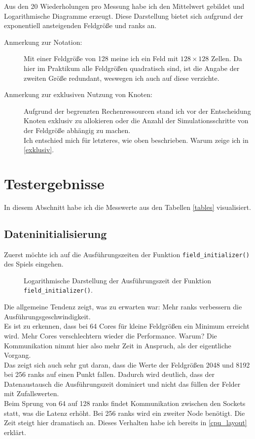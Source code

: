 \documentclass[german,plainarticle,hyperref,utf8]{zihpub}
\begin{document}
	Aus den 20 Wiederholungen pro Messung habe ich den Mittelwert gebildet und Logarithmische Diagramme erzeugt. Diese Darstellung bietet sich aufgrund der exponentiell ansteigenden Feldgröße und ranks an.
	\begin{description}
		\item[Anmerkung zur Notation:] Mit einer Feldgröße von 128 meine ich ein Feld mit $128\times 128$ Zellen. Da hier im Praktikum alle Feldgrößen quadratisch sind, ist die Angabe der zweiten Größe redundant, weswegen ich auch auf diese verzichte.
		\item[Anmerkung zur exklusiven Nutzung von Knoten:] Aufgrund der begrenzten Rechenressourcen stand ich vor der Entscheidung Knoten exklusiv zu allokieren oder die Anzahl der Simulationsschritte von der Feldgröße abhängig zu machen.\\
		Ich entschied mich für letzteres, wie oben beschrieben. Warum zeige ich in \ref{exklusiv}.
	\end{description}

	\newpage
	\section{Testergebnisse} \label{erg}
	In diesem Abschnitt habe ich die Messwerte aus den Tabellen \ref{tables} visualisiert.
	\subsection{Dateninitialisierung}
	Zuerst möchte ich auf die Ausführungszeiten der Funktion \texttt{field\_initializer()} des Spiels eingehen.\\
	
	\begin{figure}[h]
		\centering
		
		\caption{Logarithmische Darstellung der Ausführungszeit der Funktion \texttt{field\_initializer()}.}
	\end{figure}
	Die allgemeine Tendenz zeigt, was zu erwarten war: Mehr ranks verbessern die Ausführungsgeschwindigkeit.\\
	Es ist zu erkennen, dass bei 64 Cores für kleine Feldgrößen ein Minimum erreicht wird. Mehr Cores verschlechtern wieder die Performance. Warum? Die Kommunikation nimmt hier also mehr Zeit in Anspruch, als der eigentliche Vorgang.\\
	Das zeigt sich auch sehr gut daran, dass die Werte der Feldgrößen 2048 und 8192 bei 256 ranks auf einen Punkt fallen. Dadurch wird deutlich, dass der Datenaustausch die Ausführungszeit dominiert und nicht das füllen der Felder mit Zufallswerten.\\
	Beim Sprung von 64 auf 128 ranks findet Kommunikation zwischen den Sockets statt, was die Latenz erhöht. Bei 256 ranks wird ein zweiter Node benötigt. Die Zeit steigt hier dramatisch an. Dieses Verhalten habe ich bereits in \ref{cpu_layout} erklärt.
\end{document}
